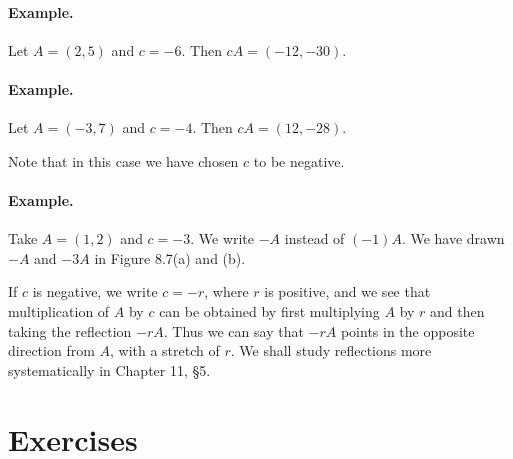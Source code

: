 \documentclass[12pt]{book} %
\begin{document}
\paragraph{Example.}
Let $A=(2,5)$ and $c=-6$. Then $cA=(-12,-30)$.

\paragraph{Example.}
Let $A=(-3,7)$ and $c=-4$. Then $cA=(12,-28)$.

Note that in this case we have chosen $c$ to be negative.

\paragraph{Example.}
Take $A=(1,2)$ and $c=-3$. We write $-A$ instead of $(-1)A$. We have drawn $-A$ and $-3A$ in Figure 8.7(a) and (b).


If $c$ is negative, we write $c=-r$, where $r$ is positive, and we see that multiplication of $A$ by $c$ can be obtained by first multiplying $A$ by $r$ and then taking the reflection $-rA$. Thus we can say that $-rA$ points in the opposite direction from $A$, with a stretch of $r$. We shall study reflections more systematically in Chapter 11, \S5.

\section*{Exercises}
\end{document}
